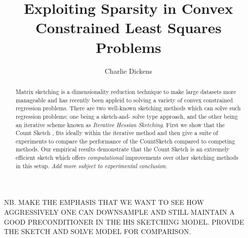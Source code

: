\documentclass[twoside]{article}
\title{Exploiting Sparsity in Convex Constrained Least Squares Problems}
\author{Charlie Dickens}
\date{}
\theoremstyle{definition}\newtheorem{thm}{Theorem}[section]
\theoremstyle{definition}\newtheorem{mydef}[thm]{Definition}
\theoremstyle{definition}\newtheorem{rem}[thm]{Remark}
\theoremstyle{definition}\newtheorem{prop}[thm]{Proposition}
\theoremstyle{definition}\newtheorem{example}[thm]{Example}
\theoremstyle{definition}\newtheorem{claim}[thm]{Claim}
\theoremstyle{definition}\newtheorem{Qu}[thm]{Question}
\theoremstyle{definition}\newtheorem{Lemma}[thm]{Lemma}
\theoremstyle{definition}\newtheorem{Cor}[thm]{Corollary}
\theoremstyle{definition}\newtheorem{Fact}[]{Fact}
\begin{document}
\maketitle

%

%





\begin{abstract}
  Matrix sketching is a dimensionality reduction technique to make large datasets
  more manageable and has recently been appleid to solving a variety of
  convex constrained regression problems.
  There are two well-known sketching methods which can solve such
  regression problems; one being a sketch-and-
  solve type approach, and the other being an iterative scheme known as \textit{
  Iterative Hessian Sketching}.
  First we show that the
  Count Sketch \cite{clarkson2013low}, fits ideally within the iterative method
  and then give a suite of experiments to compare the performance of
  the CountSketch compared to competing methods.
  Our empirical results demonstrate that the Count Sketch is an extremely efficient
  sketch which offers \textit{computational} improvements over other sketching
  methods in this setup.
  \textit{Add more subject to experimental conclusion.}
\end{abstract}

NB. MAKE THE EMPHASIS THAT WE WANT TO SEE
HOW AGGRESSIVELY ONE CAN DOWNSAMPLE AND
STILL MAINTAIN A GOOD PRECONDITIONER IN
THE IHS SKETCHING MODEL.
PROVIDE THE SKETCH AND SOLVE MODEL FOR
COMPARISON.
\end{document}
